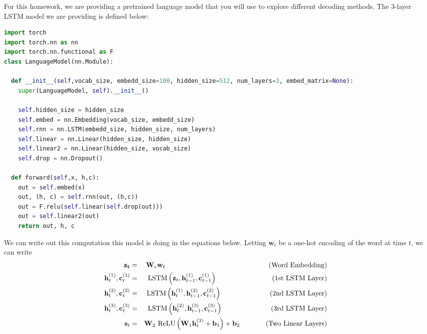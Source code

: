 \documentclass[a4paper,10pt]{article}
\begin{document}
For this homework, we are providing a pretrained language model that you will use to explore different decoding methods. The 3-layer LSTM model we are providing is defined below:
%
\begin{center}
\begin{minipage}{0.9\textwidth}
\begin{lstlisting}[language=Python, caption=Simple LSTM Language Model]
import torch
import torch.nn as nn
import torch.nn.functional as F
class LanguageModel(nn.Module):

  def __init__(self,vocab_size, embedd_size=100, hidden_size=512, num_layers=3, embed_matrix=None):
    super(LanguageModel, self).__init__()
    
    self.hidden_size = hidden_size
    self.embed = nn.Embedding(vocab_size, embedd_size)
    self.rnn = nn.LSTM(embedd_size, hidden_size, num_layers)
    self.linear = nn.Linear(hidden_size, hidden_size)
    self.linear2 = nn.Linear(hidden_size, vocab_size)
    self.drop = nn.Dropout()
    
  def forward(self,x, h,c):
    out = self.embed(x)
    out, (h, c) = self.rnn(out, (h,c))
    out = F.relu(self.linear(self.drop(out)))
    out = self.linear2(out)
    return out, h, c
\end{lstlisting}
\end{minipage}
\end{center}
%
We can write out this computation this model is doing in the equations below. Letting $\mathbf{w}_{t}$ be a one-hot encoding of the word at time $t$, we can write
%
\begin{eqnarray}
\mathbf{z_t} &=& \mathbf{W}_e\mathbf{w}_{t} \mbox{\hspace{150pt}(Word Embedding)}\\
\textbf{h}_t^{(1)}, \textbf{c}_t^{(1)} &=& \mbox{LSTM}\left(\textbf{z}_t, \textbf{h}_{t-1}^{(1)}, \textbf{c}_{t-1}^{(1)}\right) \mbox{\hspace{80pt}(1st LSTM Layer)}\\
\textbf{h}_t^{(2)}, \textbf{c}_t^{(2)} &=& \mbox{LSTM}\left(\textbf{h}_t^{(1)}, \textbf{h}_{t-1}^{(2)}, \textbf{c}_{t-1}^{(2)}\right) \mbox{\hspace{70pt}(2nd LSTM Layer)}\\
\textbf{h}_t^{(3)}, \textbf{c}_t^{(3)} &=& \mbox{LSTM}\left(\textbf{h}_t^{(2)}, \textbf{h}_{t-1}^{(3)}, \textbf{c}_{t-1}^{(3)}\right) \mbox{\hspace{70pt}(3rd LSTM Layer)}\\
\textbf{s}_t &=& \mathbf{W}_2 \mbox{ ReLU}\left(\mathbf{W}_1\mathbf{h}_t^{(3)} + \mathbf{b}_1\right) + \mathbf{b}_2 \mbox{\hspace{37.5pt}(Two Linear Layers)}
\end{eqnarray}
\end{document}

